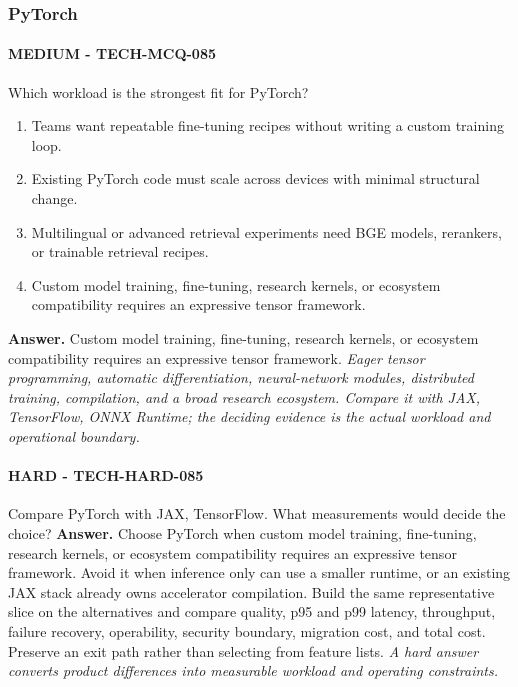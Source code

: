 \subsubsection*{PyTorch}
\paragraph{MEDIUM - TECH-MCQ-085} Which workload is the strongest fit for PyTorch?
\begin{enumerate}[label=\Alph*.]
\item Teams want repeatable fine-tuning recipes without writing a custom training loop.
\item Existing PyTorch code must scale across devices with minimal structural change.
\item Multilingual or advanced retrieval experiments need BGE models, rerankers, or trainable retrieval recipes.
\item Custom model training, fine-tuning, research kernels, or ecosystem compatibility requires an expressive tensor framework.
\end{enumerate}
\textbf{Answer.} Custom model training, fine-tuning, research kernels, or ecosystem compatibility requires an expressive tensor framework.
\textit{Eager tensor programming, automatic differentiation, neural-network modules, distributed training, compilation, and a broad research ecosystem. Compare it with JAX, TensorFlow, ONNX Runtime; the deciding evidence is the actual workload and operational boundary.}
\paragraph{HARD - TECH-HARD-085} Compare PyTorch with JAX, TensorFlow. What measurements would decide the choice?
\textbf{Answer.} Choose PyTorch when custom model training, fine-tuning, research kernels, or ecosystem compatibility requires an expressive tensor framework. Avoid it when inference only can use a smaller runtime, or an existing JAX stack already owns accelerator compilation. Build the same representative slice on the alternatives and compare quality, p95 and p99 latency, throughput, failure recovery, operability, security boundary, migration cost, and total cost. Preserve an exit path rather than selecting from feature lists.
\textit{A hard answer converts product differences into measurable workload and operating constraints.}
